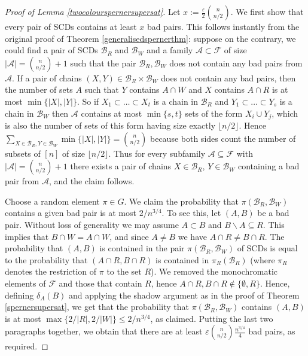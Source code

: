 \documentclass[11pt]{article}
\numberwithin{equation}{section}
\def\eps{\varepsilon}
\begin{document}
\begin{proof}[Proof of Lemma \ref{twocolourspernersupersat}]
Let $x:=\frac{\eps}{2}\binom{n}{n/2}$. We first show that every pair of SCDs contains at least $x$ bad pairs. This follows instantly from the original proof of Theorem \ref{generalisedspernerthm}: suppose on the contrary, we could find a pair of SCDs $\mathcal{B}_R$ and $\mathcal{B}_W$ and  a family $\mathcal{A}\subset \mathcal{F}$ of size $|\mathcal{A}|=\binom{n}{n/2}+1$ such that the pair $\mathcal{B}_R,\mathcal{B}_W$ does not contain any bad pairs from $\mathcal{A}$. If a pair of chains $(X,Y)\in\mathcal{B}_R\times \mathcal{B}_W$ does not contain any bad pairs, then the number of sets $A$ such that $Y$ contains $A\cap W$ and $X$ contains $A\cap R$  is at most $\min \{|X|,|Y|\}$. So if $X_1\subset \ldots \subset X_t$ is a chain in $\mathcal{B}_R$ and $Y_1\subset \ldots \subset Y_s$ is a chain in $\mathcal{B}_W$ then $\mathcal{A}$ contains at most $\min\{s,t\}$ sets of the form $X_i\cup Y_j$, which is also the number of sets of this form having size exactly $\lfloor n/2\rfloor$. Hence  $\sum_{X\in\mathcal{B}_R, Y\in\mathcal{B}_W}\min \{|X|,|Y|\}=\binom{n}{n/2}$ because  both sides count the number of subsets of $[n]$ of size $\lfloor n/2\rfloor$. Thus for every subfamily $\mathcal{A}\subseteq \mathcal{F}$ with $|\mathcal{A}|=\binom{n}{n/2}+1$  there exists a pair of chains $X \in \mathcal B_R$, $Y \in \mathcal B_W$ containing a bad pair from $\mathcal{A}$, and the claim follows. 

Choose a random element $\pi \in G$.
We claim  the probability that $\pi(\mathcal{B}_R,\mathcal{B}_W)$ contains a given bad pair is at most ${2}/{n^{3/4}}$. To see this, let $(A,B)$ be a bad pair. Without loss of generality we may assume $A\subset B$ and $B\backslash A\subseteq R$. This implies that $B\cap W = A\cap W$, and since $A\neq B$ we have $A\cap R \neq B \cap R$. The probability that $(A,B)$ is contained in the pair $\pi(\mathcal{B}_R,\mathcal{B}_W)$ of SCDs is equal to the probability that $(A\cap R, B\cap R)$ is contained in $\pi_R(\mathcal{B}_R)$ (where $\pi_R$ denotes the restriction of $\pi$ to the set $R$). We removed the monochromatic elements of $\mathcal{F}$ and those that contain $R$, hence $A\cap R,B\cap R \notin \{\emptyset,R\}$. Hence, defining $\delta_A(B)$ and applying the shadow argument as in the proof of Theorem \ref{spernersupersat}, we get that the probability that $\pi(\mathcal{B}_R,\mathcal{B}_W)$ contains $(A,B)$ is at most $\max\{2/|R|,2/|W|\}\leq 2/n^{3/4}$, as claimed. Putting the last two paragraphs together, we obtain that there are at least $\eps \binom{n}{n/2}\frac{n^{3/4}}{4}$ bad pairs, as required.
\end{proof}
\end{document}
